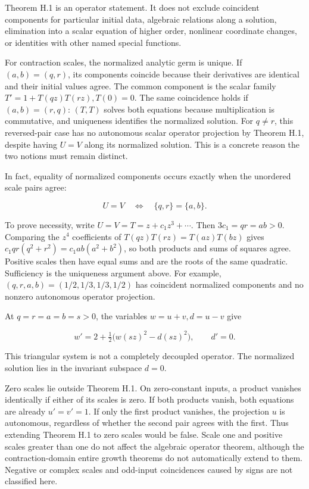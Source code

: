 Theorem H.1 is an operator statement. It does not exclude coincident
components for particular initial data, algebraic relations along a
solution, elimination into a scalar equation of higher order, nonlinear
coordinate changes, or identities with other named special functions.

For contraction scales, the normalized analytic germ is unique. If
\((a,b)=(q,r)\), its components coincide because their derivatives are
identical and their initial values agree. The common component is the
scalar family \(T'=1+T(qz)T(rz),T(0)=0\). The same coincidence holds if
\((a,b)=(r,q)\): \((T,T)\) solves both equations because multiplication
is commutative, and uniqueness identifies the normalized solution. For
\(q\ne r\), this reversed-pair case has no autonomous scalar operator
projection by Theorem H.1, despite having \(U=V\) along its normalized
solution. This is a concrete reason the two notions must remain
distinct.

In fact, equality of normalized components occurs exactly when the
unordered scale pairs agree:

\[
U=V\quad\Longleftrightarrow\quad\{q,r\}=\{a,b\}.
\tag{S7}
\]

To prove necessity, write \(U=V=T=z+c_1z^3+\cdots\). Then
\(3c_1=qr=ab>0\). Comparing the \(z^4\) coefficients of
\(T(qz)T(rz)=T(az)T(bz)\) gives \(c_1qr(q^2+r^2)=c_1ab(a^2+b^2)\), so
both products and sums of squares agree. Positive scales then have equal
sums and are the roots of the same quadratic. Sufficiency is the
uniqueness argument above. For example, \((q,r,a,b)=(1/2,1/3,1/3,1/2)\)
has coincident normalized components and no nonzero autonomous operator
projection.

At \(q=r=a=b=s>0\), the variables \(w=u+v,d=u-v\) give

\[
w'=2+\tfrac12\bigl(w(sz)^2-d(sz)^2\bigr),\qquad d'=0.
\]

This triangular system is not a completely decoupled operator. The
normalized solution lies in the invariant subspace \(d=0\).

Zero scales lie outside Theorem H.1. On zero-constant inputs, a product
vanishes identically if either of its scales is zero. If both products
vanish, both equations are already \(u'=v'=1\). If only the first
product vanishes, the projection \(u\) is autonomous, regardless of
whether the second pair agrees with the first. Thus extending Theorem H.1
to zero scales would be false. Scale one and positive scales greater
than one do not affect the algebraic operator theorem, although the
contraction-domain entire growth theorems do not automatically extend to
them. Negative or complex scales and odd-input coincidences caused by
signs are not classified here.

